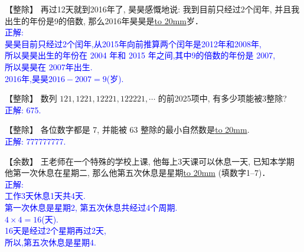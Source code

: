 
\item {
    【整除】
    再过12天就到2016年了, 昊昊感慨地说: 我到目前只经过2个闰年, 并且我出生的年份是9的倍数, 那么2016年昊昊是\underline{\hbox to 20mm{}}岁． 
    \ifshowSolution 
        \fangsong{}\textcolor{blue}{
            \\正解: \\
            昊昊目前只经过2个闰年,从2015年向前推算两个闰年是2012年和2008年,\\
            所以昊昊出生的年份在 2004 年和 2015 年之间,其中9的倍数的年份是 2007,\\
            所以昊昊在 2007年出生.\\
            2016年,昊昊$2016-2007=9$(岁).
        }
    \else
        \vspace{1cm}
    \fi
}

\item {
    【整除】
    数列 $121, 1221, 12221, 122221,\cdots$ 的前2025项中, 有多少项能被3整除? 
    \ifshowSolution
        \\\fangsong{}\textcolor{blue}{
            正解: 675.
        }
    \else
        \vspace{1cm}
    \fi
}

\item {
    【整除】
    各位数字都是 7, 并能被 63 整除的最小自然数是\underline{\hbox to 20mm{}}.
    \ifshowSolution
        \\\fangsong{}\textcolor{blue}{
            正解: 777777777.
        }
    \else
        \vspace{1cm}
    \fi
}

\item {
    【余数】
    王老师在一个特殊的学校上课, 他每上3天课可以休息一天, 已知本学期他第一次休息在星期二, 那么他第五次休息是星期\underline{\hbox to 20mm{}} (填数字1--7)．
    \ifshowSolution
        \\\fangsong{}\textcolor{blue}{
            正解: \\
            工作3天休息1天共4天.\\
            第一次休息是星期2, 第五次休息共经过4个周期.\\
            $4\times 4=16$(天).\\
            16天是经过2个星期再过2天,\\
            所以,第五次休息是星期4.
        }
    \else
        \vspace{1cm}
    \fi
}

